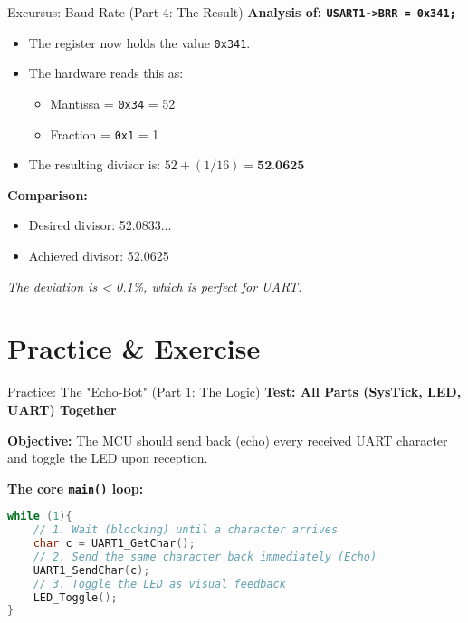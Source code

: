 \documentclass{beamer}
\begin{document}
\begin{frame}[fragile]{Excursus: Baud Rate (Part 4: The Result)}
\textbf{Analysis of: \texttt{USART1->BRR = 0x341;}}

\begin{itemize}
\item The register now holds the value \texttt{0x341}.
\item The hardware reads this as:
\begin{itemize}
	\item Mantissa = \texttt{0x34} = 52
	\item Fraction = \texttt{0x1} = 1
\end{itemize}
\item The resulting divisor is: $52 + (1/16) = \textbf{52.0625}$
\end{itemize}

\medskip
\textbf{Comparison:}
\begin{itemize}
\item Desired divisor: 52.0833...
\item Achieved divisor: 52.0625
\end{itemize}
\rightarrow \textit{The deviation is < 0.1\%, which is perfect for UART.}
\end{frame}

\section{Practice \& Exercise}


\begin{frame}[fragile]{Practice: The "Echo-Bot" (Part 1: The Logic)}
	\textbf{Test: All Parts (SysTick, LED, UART) Together}
	
	\medskip
	\textbf{Objective:} The MCU should send back (echo) every received UART character and toggle the LED upon reception.
	
	\bigskip
	\textbf{The core \texttt{main()} loop:}
	\begin{lstlisting}[language=C, style=mystyle]
while (1){
	// 1. Wait (blocking) until a character arrives
	char c = UART1_GetChar();
	// 2. Send the same character back immediately (Echo)
	UART1_SendChar(c);	
	// 3. Toggle the LED as visual feedback
	LED_Toggle();
}
	\end{lstlisting}
\end{frame}

\end{document}
